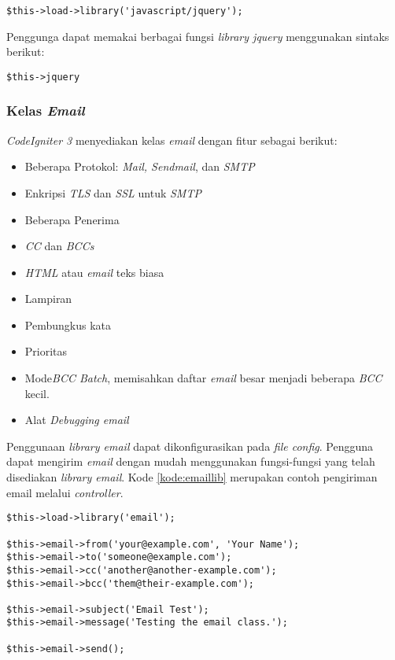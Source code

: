 \begin{center}
\verb|$this->load->library('javascript/jquery');|
\end{center}

Penggunga dapat memakai berbagai fungsi \textit{library jquery} menggunakan sintaks berikut:

\begin{center}
\verb|$this->jquery|
\end{center}

\subsubsection{Kelas \textit{Email}}
\textit{CodeIgniter 3} menyediakan kelas \textit{email} dengan fitur sebagai berikut:

\begin{itemize}
\item Beberapa Protokol: \textit{Mail, Sendmail}, dan \textit{SMTP}
\item Enkripsi \textit{TLS} dan \textit{SSL} untuk \textit{SMTP}
\item Beberapa Penerima
\item \textit{CC} dan \textit{BCCs}
\item \textit{HTML} atau \textit{email} teks biasa
\item Lampiran
\item Pembungkus kata
\item Prioritas
\item Mode\textit{BCC Batch}, memisahkan daftar \textit{email} besar menjadi beberapa \textit{BCC} kecil.
\item Alat \textit{Debugging email}
\end{itemize}

Penggunaan \textit{library email} dapat dikonfigurasikan pada \textit{file config}. Pengguna dapat mengirim \textit{email} dengan mudah menggunakan fungsi-fungsi yang telah disediakan \textit{library email}. Kode \ref{kode:emaillib} merupakan contoh pengiriman email melalui \textit{controller}.

\begin{lstlisting}[caption=Contoh pengiriman email melalui \textit{controller}, label=kode:emaillib]
$this->load->library('email');

$this->email->from('your@example.com', 'Your Name');
$this->email->to('someone@example.com');
$this->email->cc('another@another-example.com');
$this->email->bcc('them@their-example.com');

$this->email->subject('Email Test');
$this->email->message('Testing the email class.');

$this->email->send();
\end{lstlisting}

